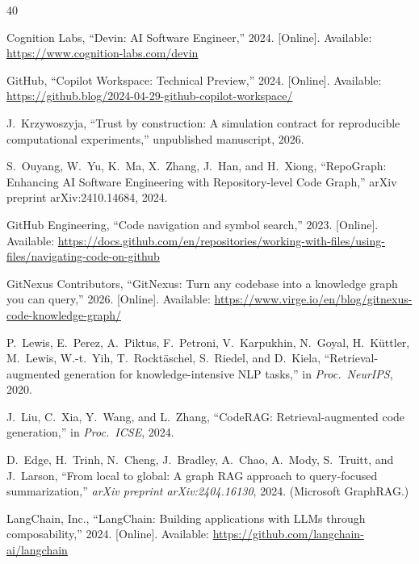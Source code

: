 \documentclass[conference]{IEEEtran}
\begin{document}
\iffalse
\begin{thebibliography}{40}

Cognition Labs, ``Devin: AI Software Engineer,'' 2024.
[Online]. Available: \url{https://www.cognition-labs.com/devin}

GitHub, ``Copilot Workspace: Technical Preview,'' 2024.
[Online]. Available: \url{https://github.blog/2024-04-29-github-copilot-workspace/}

J.~Krzywoszyja, ``Trust by construction: A simulation contract for
reproducible computational experiments,'' unpublished manuscript, 2026.

S.~Ouyang, W.~Yu, K.~Ma, X.~Zhang, J.~Han, and H.~Xiong,
``RepoGraph: Enhancing AI Software Engineering with Repository-level Code
Graph,'' arXiv preprint arXiv:2410.14684, 2024.

GitHub Engineering, ``Code navigation and symbol search,'' 2023.
[Online]. Available: \url{https://docs.github.com/en/repositories/working-with-files/using-files/navigating-code-on-github}

GitNexus Contributors, ``GitNexus: Turn any codebase into a knowledge
graph you can query,'' 2026.
[Online]. Available: \url{https://www.virge.io/en/blog/gitnexus-code-knowledge-graph/}

P.~Lewis, E.~Perez, A.~Piktus, F.~Petroni, V.~Karpukhin, N.~Goyal,
H.~K\"{u}ttler, M.~Lewis, W.-t.~Yih, T.~Rockt\"{a}schel, S.~Riedel,
and D.~Kiela, ``Retrieval-augmented generation for knowledge-intensive
NLP tasks,'' in \emph{Proc.\ NeurIPS}, 2020.

J.~Liu, C.~Xia, Y.~Wang, and L.~Zhang, ``CodeRAG: Retrieval-augmented
code generation,'' in \emph{Proc.\ ICSE}, 2024.

D.~Edge, H.~Trinh, N.~Cheng, J.~Bradley, A.~Chao, A.~Mody,
S.~Truitt, and J.~Larson, ``From local to global: A graph RAG approach
to query-focused summarization,'' \emph{arXiv preprint
arXiv:2404.16130}, 2024. (Microsoft GraphRAG.)

LangChain, Inc., ``LangChain: Building applications with LLMs through
composability,'' 2024. [Online]. Available:
\url{https://github.com/langchain-ai/langchain}


\end{thebibliography}
\end{document}
